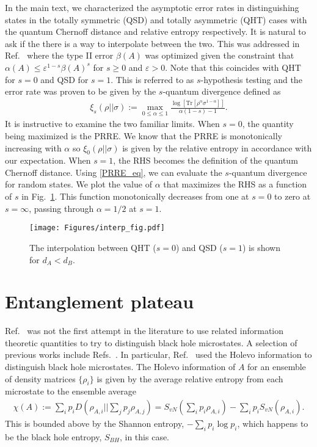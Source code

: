 \documentclass[a4paper,11pt]{article}
\newcommand{\Tr}{\text{Tr}}
\begin{document}
In the main text, we characterized the asymptotic error rates in distinguishing states in the totally symmetric (QSD) and totally asymmetric (QHT) cases with the quantum Chernoff distance and relative entropy respectively. It is natural to ask if the there is a way to interpolate between the two. This was addressed in Ref.~\cite{2021arXiv210409553S} where the type II error $\beta(A)$ was optimized given the constraint that $\alpha(A) \leq \varepsilon^{1-s} \beta(A)^s$ for $s \geq 0$ and $\varepsilon > 0$. Note that this coincides with QHT for $s = 0$ and QSD for $s=1$. This is referred to as $s$-hypothesis testing and the error rate was proven to be given by the $s$-quantum divergence defined as
\begin{align}
    \xi_s(\rho||\sigma) := \max_{0\leq \alpha \leq 1} \frac{\log \left[ \Tr \left[ \rho^{\alpha}\sigma^{1-\alpha}\right]\right]}{\alpha(1-s)-1}.
\end{align}
It is instructive to examine the two familiar limits. When $s = 0$, the quantity being maximized is the PRRE. We know that the PRRE is monotonically increasing with $\alpha$ so $\xi_0(\rho||\sigma)$ is given by the relative entropy in accordance with our expectation. When $s = 1$, the RHS becomes the definition of the quantum Chernoff distance. Using \eqref{PRRE_eq}, we can evaluate the $s$-quantum divergence for random states. We plot the value of $\alpha$ that maximizes the RHS as a function of $s$ in Fig.~\ref{interp_fig}. This function monotonically decreases from one at $s = 0$ to zero at $s = \infty$, passing through $\alpha = 1/2$ at $s = 1$.

\begin{figure}
    \centering
    \texttt{[image: Figures/interp\_fig.pdf]}
    \caption{The interpolation between QHT ($s=0$) and QSD ($s=1$) is shown for $d_A < d_B$.}
    \label{interp_fig}
\end{figure}



\section{Entanglement plateau}

Ref.~\cite{2021PhRvL.126q1603K} was not the first attempt in the literature to use related information theoretic quantities to try to distinguish black hole microstates. A selection of previous works include Refs.~\cite{2017PhRvD..96f6017B,2016arXiv161000302L,2017JHEP...02..060S,2018JHEP...07..179M,2018PhRvL.121y1603G,2020arXiv201012565A}. In particular, Ref.~\cite{2017PhRvD..96f6017B} used the Holevo information to distinguish black hole microstates. The Holevo information of $A$ for an ensemble of density matrices $\{ \rho_i \}$ is given by the average relative entropy from each microstate to the ensemble average
\begin{align}
    \chi(A) := \sum_i p_i D\left(\rho_{A,i} ||\sum_j p_j \rho_{A,j}\right) = S_{vN}\left(\sum_i p_i\rho_{A,i}\right) - \sum_i p_i S_{vN}(\rho_{A,i}).
\end{align}
This is bounded above by the Shannon entropy, $-\sum_i p_i \log p_i$, which happens to be the black hole entropy, $S_{BH}$, in this case.
\end{document}
